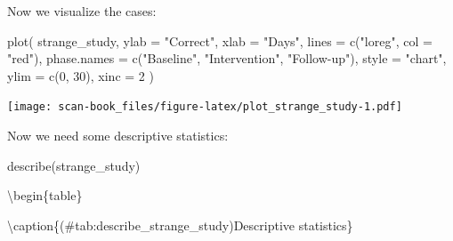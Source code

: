 \documentclass[
]{book}
\newenvironment{Shaded}{\begin{snugshade}}{\end{snugshade}}
\newcommand{\AttributeTok}[1]{\textcolor[rgb]{0.77,0.63,0.00}{#1}}
\newcommand{\DecValTok}[1]{\textcolor[rgb]{0.00,0.00,0.81}{#1}}
\newcommand{\FunctionTok}[1]{\textcolor[rgb]{0.00,0.00,0.00}{#1}}
\newcommand{\NormalTok}[1]{#1}
\newcommand{\StringTok}[1]{\textcolor[rgb]{0.31,0.60,0.02}{#1}}
\begin{document}
Now we visualize the cases:

\begin{Shaded}
\begin{Highlighting}[]
\FunctionTok{plot}\NormalTok{(}
\NormalTok{  strange\_study,}
  \AttributeTok{ylab =} \StringTok{"Correct"}\NormalTok{,}
  \AttributeTok{xlab =} \StringTok{"Days"}\NormalTok{,}
  \AttributeTok{lines =} \FunctionTok{c}\NormalTok{(}\StringTok{"loreg"}\NormalTok{, }\AttributeTok{col =} \StringTok{"red"}\NormalTok{),}
  \AttributeTok{phase.names =} \FunctionTok{c}\NormalTok{(}\StringTok{"Baseline"}\NormalTok{, }\StringTok{"Intervention"}\NormalTok{, }\StringTok{"Follow{-}up"}\NormalTok{),}
  \AttributeTok{style =} \StringTok{"chart"}\NormalTok{,}
  \AttributeTok{ylim =} \FunctionTok{c}\NormalTok{(}\DecValTok{0}\NormalTok{, }\DecValTok{30}\NormalTok{),}
  \AttributeTok{xinc =} \DecValTok{2}
\NormalTok{)}
\end{Highlighting}
\end{Shaded}

\texttt{[image: scan-book\_files/figure-latex/plot\_strange\_study-1.pdf]}

Now we need some descriptive statistics:

\begin{Shaded}
\begin{Highlighting}[]
\FunctionTok{describe}\NormalTok{(strange\_study)}
\end{Highlighting}
\end{Shaded}

\textbackslash begin\{table\}

\textbackslash caption\{(\#tab:describe\_strange\_study)Descriptive statistics\}
\centering
\end{document}
